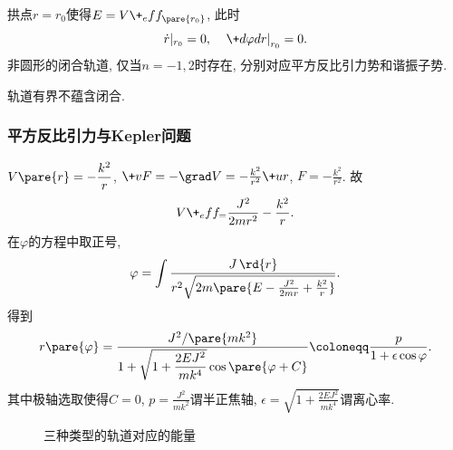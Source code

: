\documentclass{ctexart}
\begin{document}

拱点$r=r_0$使得$E = V\+_eff_\pare{r_0}$, 此时
\[ \dot{r}\vert_{r_0} = 0,\quad \left.\+d\varphi dr\right\vert_{r_0} = 0. \]
非圆形的闭合轨道, 仅当$n=-1, 2$时存在, 分别对应平方反比引力势和谐振子势.
\begin{remark}
    轨道有界不蕴含闭合.
\end{remark}


\subsubsection{平方反比引力与Kepler问题} %
\label{ssub:平方反比引力与kepler问题}

$\displaystyle V\pare{r} = -\frac{k^2}{r}$, $\+vF = -\grad V = -\frac{k^2}{r^2}\+ur$, $F = -\frac{k^2}{r^2}$. 故
\[ V\+_eff_ = \frac{J^2}{2mr^2} - \frac{k^2}{r}. \]
在$\varphi$的方程中取正号,
\[ \varphi = \int \frac{J\,\rd{r}}{r^2\sqrt{2m\pare{E - \frac{J^2}{2mr} + \frac{k^2}{r}}}}. \]
得到
\[ r\pare{\varphi} = \frac{J^2/\pare{mk^2}}{1+\sqrt{1+\displaystyle \frac{2EJ^2}{mk^4}}\cos\pare{\varphi + C}} \coloneqq \frac{p}{1+\epsilon \cos\varphi}. \]
其中极轴选取使得$C=0$, $p = \displaystyle\frac{J^2}{mk^2}$谓半正焦轴, $\epsilon = \displaystyle \sqrt{1+\frac{2EJ^2}{mk^4}}$谓离心率.
\begin{figure}[ht]
    \centering
    \begin{subfigure}{2.5cm}
        \centering
        \caption{}
        \label{fig:双曲线轨道}
    \end{subfigure}
    \hspace{1cm}
    \begin{subfigure}{2.5cm}
        \centering
        \caption{}
        \label{fig:抛物线轨道}
    \end{subfigure}
    \hspace{1cm}
    \begin{subfigure}{3.5cm}
        \centering
        \caption{}
        \label{fig:椭圆轨道}
    \end{subfigure}
    \caption{}
\end{figure}
\begin{figure}[ht]
    \centering
    \caption{三种类型的轨道对应的能量}
\end{figure}
\end{document}
